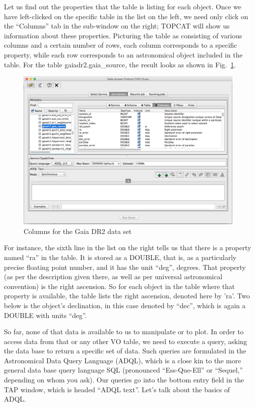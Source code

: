 \documentclass[twocolumn,apj]{openjournal}
\begin{document}
Let us find out the properties that the table is listing for each object. Once we have left-clicked on the specific table in the list on the left, we need only click on the  ``Columns'' tab in the sub-window on the right; TOPCAT will show us information about these properties. Picturing the table as consisting of various columns and a certain number of rows, each column corresponds to a specific property, while each row corresponds to an astronomical object included in the table. For the table gaiadr2.gaia\_source, the result looks as shown in Fig.~\ref{GaiaSources}.
\begin{figure}[htbp]
\begin{center}
\includegraphics[width=\linewidth]{gaia-sources.png}
\caption{Columns for the Gaia DR2 data set}
\label{GaiaSources}
\end{center}
\end{figure}
For instance, the sixth line in the list on the right tells us that there is a property named ``ra'' in the table. It is stored as a DOUBLE, that is, as a particularly precise floating point number, and it has the unit ``deg'', degrees. That property (as per the description given there, as well as per universal astronomical convention) is the right ascension. So for each object in the table where that property is available, the table lists the right ascension, denoted here by 'ra'. Two below is the object's declination, in this case denoted by ``dec'', which is again a DOUBLE with units ``deg''.  

So far, none of that data is available to us to manipulate or to plot. In order to access data from that or any other VO table, we need to execute a query, asking the data base to return a specific set of data. Such queries are formulated in the Astronomical Data Query Language (ADQL), which is a close kin to the more general data base query language SQL (pronounced ``Ess-Que-Ell'' or ``Sequel,'' depending on whom you ask). Our queries go into the bottom entry field in the TAP window, which is headed ``ADQL text''. Let's talk about the basics of ADQL.
\end{document}
